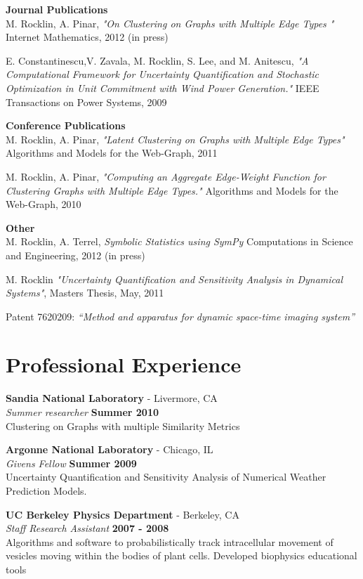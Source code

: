 \documentclass[margin,line]{res}
\begin{document}
\begin{resume}
{\bf Journal Publications}\\
M. Rocklin, A. Pinar, \textit{"On Clustering on Graphs with Multiple Edge Types
"} Internet Mathematics, 2012 (in press)

E. Constantinescu,V. Zavala, M. Rocklin, S. Lee, and M. Anitescu, \textit{"A Computational Framework for Uncertainty Quantification and Stochastic Optimization in Unit Commitment with Wind Power Generation."} IEEE Transactions on Power Systems, 2009


{\bf Conference Publications}\\
M. Rocklin, A. Pinar, \textit{"Latent Clustering on Graphs with Multiple Edge Types"} Algorithms and Models for the Web-Graph, 2011

M. Rocklin, A. Pinar, \textit{"Computing an Aggregate Edge-Weight Function for Clustering Graphs with Multiple Edge Types."} Algorithms and Models for the Web-Graph, 2010

{\bf Other}\\
M. Rocklin, A. Terrel, \textit{Symbolic Statistics using SymPy} Computations in
Science and Engineering, 2012 (in press)

M. Rocklin \textit{"Uncertainty Quantification and Sensitivity Analysis in Dynamical Systems"}, Masters Thesis, May, 2011

Patent 7620209: \textit{“Method and apparatus for dynamic space-time imaging system”}

\section{\sc Professional Experience}

{\bf Sandia National Laboratory } - Livermore, CA\\
{\em Summer researcher} \hfill {\bf Summer 2010}\\
Clustering on Graphs with multiple Similarity Metrics 

{\bf Argonne National Laboratory} - Chicago, IL\\
{\em Givens Fellow} \hfill {\bf Summer 2009}\\
Uncertainty Quantification and Sensitivity Analysis of Numerical Weather Prediction Models.

{\bf UC Berkeley Physics Department} - Berkeley, CA\\
{\em Staff Research Assistant} \hfill {\bf 2007 - 2008}\\
Algorithms and software to probabilistically track intracellular movement of vesicles moving within the bodies of plant cells. Developed biophysics educational tools


\end{resume}
\end{document}
